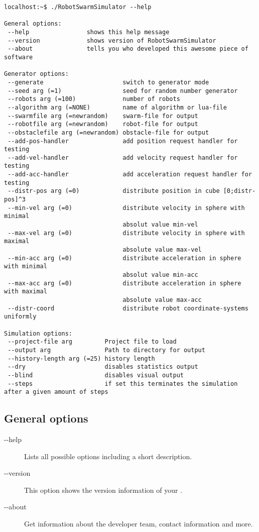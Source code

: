 \begin{lstlisting}[caption={\RSS Helpline},label=lst:RSS-help]
localhost:~$ ./RobotSwarmSimulator --help

General options:
 --help                shows this help message
 --version             shows version of RobotSwarmSimulator
 --about               tells you who developed this awesome piece of software

Generator options:
 --generate                      switch to generator mode
 --seed arg (=1)                 seed for random number generator
 --robots arg (=100)             number of robots
 --algorithm arg (=NONE)         name of algorithm or lua-file
 --swarmfile arg (=newrandom)    swarm-file for output
 --robotfile arg (=newrandom)    robot-file for output
 --obstaclefile arg (=newrandom) obstacle-file for output
 --add-pos-handler               add position request handler for testing
 --add-vel-handler               add velocity request handler for testing
 --add-acc-handler               add acceleration request handler for testing
 --distr-pos arg (=0)            distribute position in cube [0;distr-pos]^3
 --min-vel arg (=0)              distribute velocity in sphere with minimal  
                                 absolut value min-vel
 --max-vel arg (=0)              distribute velocity in sphere with maximal
                                 absolute value max-vel
 --min-acc arg (=0)              distribute acceleration in sphere with minimal  
                                 absolut value min-acc
 --max-acc arg (=0)              distribute acceleration in sphere with maximal
                                 absolute value max-acc
 --distr-coord                   distribute robot coordinate-systems uniformly

Simulation options:
 --project-file arg         Project file to load
 --output arg               Path to directory for output
 --history-length arg (=25) history length
 --dry                      disables statistics output
 --blind                    disables visual output
 --steps                    if set this terminates the simulation after a given amount of steps
\end{lstlisting}


\subsection{General options}
\begin{description}
	\item [-{}-help] Lists all possible options including a short description.
	\item [-{}-version] This option shows the version information of your \RSS.
	\item [-{}-about] Get information about the developer team, contact information and more.
\end{description}


